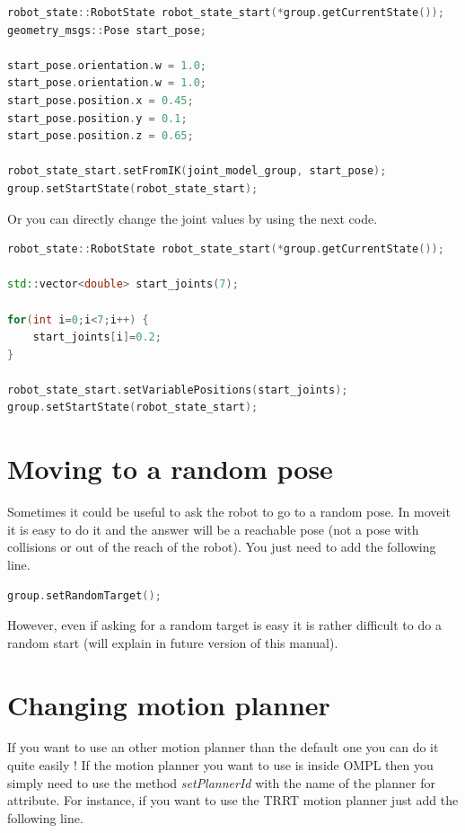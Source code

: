 \begin{lstlisting}[language=c++]
robot_state::RobotState robot_state_start(*group.getCurrentState());
geometry_msgs::Pose start_pose;
  
start_pose.orientation.w = 1.0; 
start_pose.orientation.w = 1.0;
start_pose.position.x = 0.45;
start_pose.position.y = 0.1;
start_pose.position.z = 0.65;
  
robot_state_start.setFromIK(joint_model_group, start_pose);
group.setStartState(robot_state_start);
\end{lstlisting}

Or you can directly change the joint values by using the next code.


\begin{lstlisting}[language=c++]
robot_state::RobotState robot_state_start(*group.getCurrentState());
    
std::vector<double> start_joints(7);

for(int i=0;i<7;i++) {
	start_joints[i]=0.2;
}
      
robot_state_start.setVariablePositions(start_joints);
group.setStartState(robot_state_start);
\end{lstlisting}




\section{Moving to a random pose}

Sometimes it could be useful to ask the robot to go to a random pose. In moveit it is easy to do it and the answer will be a reachable pose (not a pose with collisions or out of the reach of the robot). You just need to add the following line.

\begin{lstlisting}[language=c++]
group.setRandomTarget();
\end{lstlisting}

However, even if asking for a random target is easy it is rather difficult to do a random start (will explain in future version of this manual).

\section{Changing motion planner}

If you want to use an other motion planner than the default one you can do it quite easily ! If the motion planner you want to use is inside OMPL then you simply need to use the method \emph{setPlannerId} with the name of the planner for attribute. For instance, if you want to use the TRRT motion planner just add the following line.


